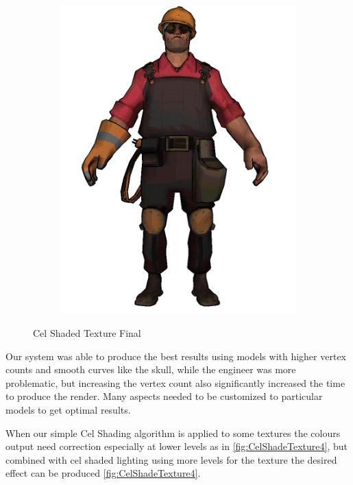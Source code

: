 
\begin{figure}
\centering
\begin{subfigure}[b]{0.28\textwidth}
        \includegraphics[width=\textwidth]{img/Textures/TextureLightingCelShade.png}
\end{subfigure}
\caption{Cel Shaded Texture Final}
 \label{fig:TextureLightingCelShade}
\end{figure} 

Our system was able to produce the best results using models with higher vertex counts and smooth curves like the skull, while the engineer was more problematic, but increasing the vertex count also significantly increased the time to produce the render. Many aspects needed to be customized to particular models to get optimal results.

When our simple Cel Shading algorithm is applied to some textures the colours output need correction especially at lower levels as in \ref{fig:CelShadeTexture4}, but combined with cel shaded lighting using more levels for the texture the desired effect can be produced \ref{fig:CelShadeTexture4}. 

